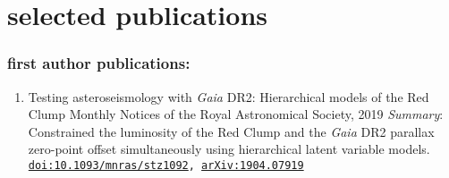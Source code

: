 \documentclass[letterpaper]{k-cv} %
\begin{document}
\clearpage
{}



\section{\color{c2}selected publications}
\vspace{-0.5cm}
\subsubsection*{\color{c2}first author publications:}
\vspace{-0.2cm}
\begin{enumerate}
	\item {}
	{Testing asteroseismology with \textit{Gaia} DR2: Hierarchical models of the Red Clump}
	{Monthly Notices of the Royal Astronomical Society, 2019}
	{\textit{Summary}: Constrained the luminosity of the Red Clump and the \textit{Gaia} DR2 parallax zero-point offset simultaneously using hierarchical latent variable models.}
	{\texttt{\href{https://academic.oup.com/mnras/article-abstract/486/3/3569/5475128}{doi:10.1093/mnras/stz1092}, \href{https://arxiv.org/abs/1904.07919}{arXiv:1904.07919}}}
\end{enumerate}
\end{document}
